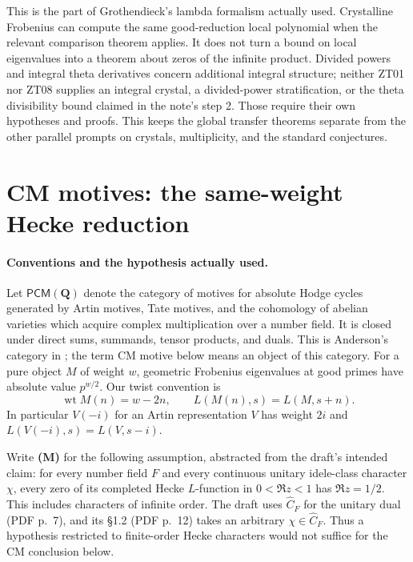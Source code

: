 \documentclass[11pt,a4paper]{article}
\theoremstyle{definition}
\begin{document}
This is the part of Grothendieck's lambda formalism actually used.
Crystalline Frobenius can compute the same good-reduction local
polynomial when the relevant comparison theorem applies.  It does
not turn a bound on local eigenvalues into a theorem about zeros
of the infinite product.  Divided powers and integral theta
derivatives concern additional integral structure; neither ZT01
nor ZT08 supplies an integral crystal, a divided-power stratification,
or the theta divisibility bound claimed in the note's step 2.
Those require their own hypotheses and proofs.  This keeps the
global transfer theorems separate from the other parallel prompts
on crystals, multiplicity, and the standard conjectures.


\section{CM motives: the same-weight Hecke reduction}

\paragraph{Conventions and the hypothesis actually used.}
Let $\mathsf{PCM}(\mathbf Q)$ denote the category of motives for absolute
Hodge cycles generated by Artin motives, Tate motives, and the cohomology of
abelian varieties which acquire complex multiplication over a number field.
It is closed under direct sums, summands, tensor products, and duals.
This is Anderson's category in \cite[\S5.3]{Anderson1986}; the term CM motive
below means an object of this category. For a pure object $M$ of weight $w$,
geometric Frobenius eigenvalues at good primes have absolute value $p^{w/2}$.
Our twist convention is
\[
  \operatorname{wt}M(n)=w-2n,\qquad L(M(n),s)=L(M,s+n).
\]
In particular $V(-i)$ for an Artin representation $V$ has weight $2i$ and
$L(V(-i),s)=L(V,s-i)$.

Write \textbf{(M)} for the following assumption, abstracted from the draft's
intended claim: for every number field $F$ and every continuous unitary
idele-class character $\chi$, every zero of its completed Hecke $L$-function
in $0<\Re z<1$ has $\Re z=1/2$. This includes characters of infinite order.
The draft uses $\widehat C_F$ for the unitary dual (PDF p.~7), and its
\S1.2 (PDF p.~12) takes an arbitrary $\chi\in\widehat C_F$.
Thus a hypothesis restricted to finite-order Hecke characters would not
suffice for the CM conclusion below.
\end{document}
